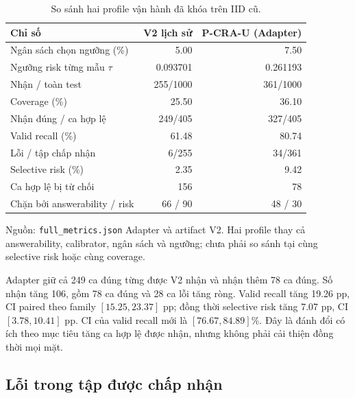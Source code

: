 \begin{table}[htbp]
    \centering
    \setlength{\tabcolsep}{4pt}
    \renewcommand{\arraystretch}{1.15}
    \caption{So sánh hai profile vận hành đã khóa trên IID cũ.}
    \label{tab:results-adapter-policy-comparison}
    \small
    \begin{tabularx}{\textwidth}{@{}>{\raggedright\arraybackslash}Xrr@{}}
        \toprule
        Chỉ số & V2 lịch sử & P-CRA-U (Adapter) \\
        \midrule
        Ngân sách chọn ngưỡng (\%) & 5.00 & 7.50 \\
        Ngưỡng risk từng mẫu $\tau$ & 0.093701 & 0.261193 \\
        Nhận / toàn test & 255/1000 & 361/1000 \\
        Coverage (\%) & 25.50 & 36.10 \\
        Nhận đúng / ca hợp lệ & 249/405 & 327/405 \\
        Valid recall (\%) & 61.48 & 80.74 \\
        Lỗi / tập chấp nhận & 6/255 & 34/361 \\
        Selective risk (\%) & 2.35 & 9.42 \\
        Ca hợp lệ bị từ chối & 156 & 78 \\
        Chặn bởi answerability / risk & 66 / 90 & 48 / 30 \\
        \bottomrule
    \end{tabularx}
    {\footnotesize\raggedright Nguồn: \texttt{full\_\allowbreak metrics.json} Adapter và artifact V2.
    Hai profile thay cả answerability, calibrator, ngân sách và ngưỡng;
    chưa phải so sánh tại cùng selective risk hoặc cùng coverage.\par}
\end{table}

Adapter giữ cả 249 ca đúng từng được V2 nhận và nhận thêm 78 ca đúng.
Số nhận tăng 106, gồm 78 ca đúng và 28 ca lỗi tăng ròng. Valid recall
tăng 19.26 pp, CI paired theo family $[15.25,23.37]$ pp; đồng thời
selective risk tăng 7.07 pp, CI $[3.78,10.41]$ pp. CI của valid recall
mới là $[76.67,84.89]\%$. Đây là đánh đổi có ích theo mục tiêu tăng
ca hợp lệ được nhận, nhưng không phải cải thiện đồng thời mọi mặt.

\subsection{Lỗi trong tập được chấp nhận}

